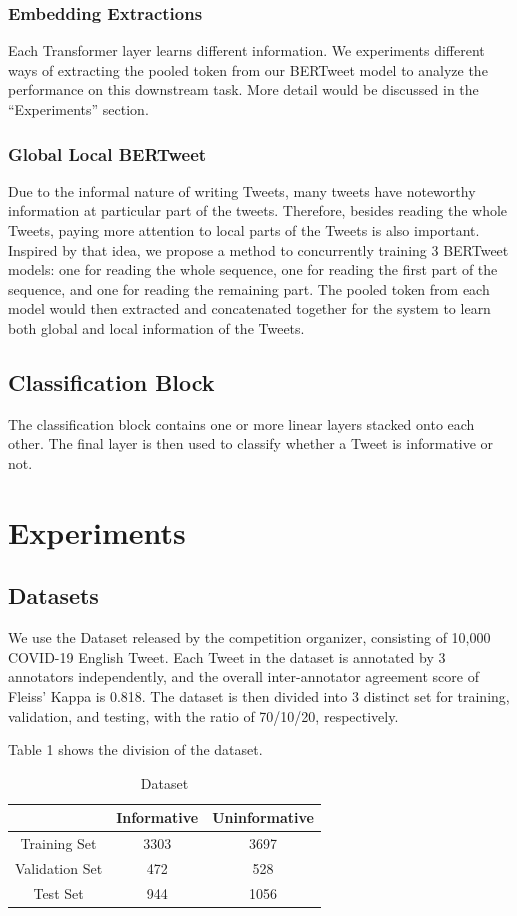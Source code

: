 \documentclass[11pt,a4paper]{article}
\begin{document}
\subsubsection{Embedding Extractions}
Each Transformer layer learns different information. We experiments different ways of extracting the pooled token from our BERTweet model to analyze the performance on this downstream task. More detail would be discussed in the ``Experiments'' section.

\subsubsection{Global Local BERTweet}
Due to the informal nature of writing Tweets, many tweets have noteworthy information at particular part of the tweets. Therefore, besides reading the whole Tweets, paying more attention to local parts of the Tweets is also important. Inspired by that idea, we propose a method to concurrently training 3 BERTweet models: one for reading the whole sequence, one for reading the first part of the sequence, and one for reading the remaining part. The pooled token from each model would then extracted and concatenated together for the system to learn both global and local information of the Tweets.

\subsection{Classification Block}
The classification block contains one or more linear layers stacked onto each other. The final layer is then used to classify whether a Tweet is informative or not.

\section{Experiments}
\subsection{Datasets}
We use the Dataset released by the competition organizer, consisting of 10,000 COVID-19 English Tweet. Each Tweet in the dataset is annotated by 3 annotators independently, and the overall inter-annotator agreement score of Fleiss' Kappa is 0.818. The dataset is then divided into 3 distinct set for training, validation, and testing, with the ratio of 70/10/20, respectively.

Table 1 shows the division of the dataset.

\begin{table}
    \centering
    \begin{tabular}{|c|c|c|}
        \hline
         & \bf{Informative} & \bf{Uninformative} \\ \hline
        Training Set & 3303 & 3697 \\ \hline
        Validation Set & 472 & 528 \\ \hline
        Test Set & 944 & 1056 \\ \hline
    \end{tabular}
    \caption{Dataset}
    \label{tab:Dataset}
\end{table}
\end{document}
